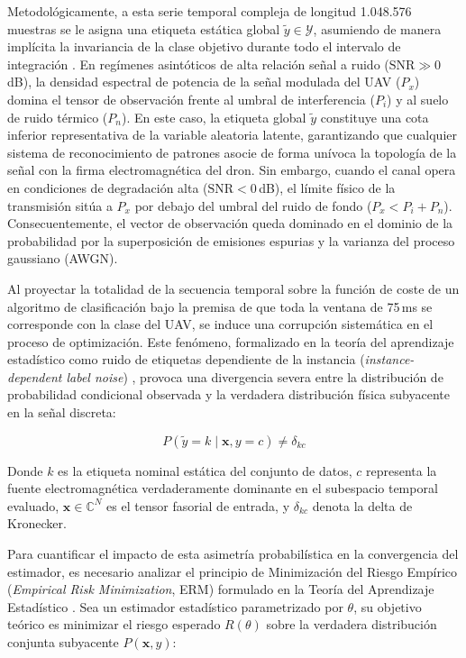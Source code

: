 Metodológicamente, a esta serie temporal compleja de longitud 1.048.576 muestras se le asigna una etiqueta estática global $\tilde{y} \in \mathcal{Y}$, asumiendo de manera implícita la invariancia de la clase objetivo durante todo el intervalo de integración \cite{gluge_robust_2024}. En regímenes asintóticos de alta relación señal a ruido ($\text{SNR} \gg 0$\,dB), la densidad espectral de potencia de la señal modulada del UAV ($P_x$) domina el tensor de observación frente al umbral de interferencia ($P_i$) y al suelo de ruido térmico ($P_n$). En este caso, la etiqueta global $\tilde{y}$ constituye una cota inferior representativa de la variable aleatoria latente, garantizando que cualquier sistema de reconocimiento de patrones asocie de forma unívoca la topología de la señal con la firma electromagnética del dron. Sin embargo, cuando el canal opera en condiciones de degradación alta ($\text{SNR} < 0$\,dB), el límite físico de la transmisión sitúa a $P_x$ por debajo del umbral del ruido de fondo ($P_x < P_i + P_n$). Consecuentemente, el vector de observación queda dominado en el dominio de la probabilidad por la superposición de emisiones espurias y la varianza del proceso gaussiano (AWGN).

Al proyectar la totalidad de la secuencia temporal sobre la función de coste de un algoritmo de clasificación bajo la premisa de que toda la ventana de 75\,ms se corresponde con la clase del UAV, se induce una corrupción sistemática en el proceso de optimización. Este fenómeno, formalizado en la teoría del aprendizaje estadístico como ruido de etiquetas dependiente de la instancia (\textit{instance-dependent label noise}) \cite{frenay_classification_2014, song_learning_2022}, provoca una divergencia severa entre la distribución de probabilidad condicional observada y la verdadera distribución física subyacente en la señal discreta:

\begin{equation}
    P(\tilde{y} = k \mid \mathbf{x}, y = c) \neq \delta_{kc}
    \label{eq:label_noise}
\end{equation}

Donde $k$ es la etiqueta nominal estática del conjunto de datos, $c$ representa la fuente electromagnética verdaderamente dominante en el subespacio temporal evaluado, $\mathbf{x} \in \mathbb{C}^N$ es el tensor fasorial de entrada, y $\delta_{kc}$ denota la delta de Kronecker.

Para cuantificar el impacto de esta asimetría probabilística en la convergencia del estimador, es necesario analizar el principio de Minimización del Riesgo Empírico (\textit{Empirical Risk Minimization}, ERM) formulado en la Teoría del Aprendizaje Estadístico \cite{vapnik_nature_1998}. Sea un estimador estadístico parametrizado por $\theta$, su objetivo teórico es minimizar el riesgo esperado $R(\theta)$ sobre la verdadera distribución conjunta subyacente $P(\mathbf{x}, y)$:

